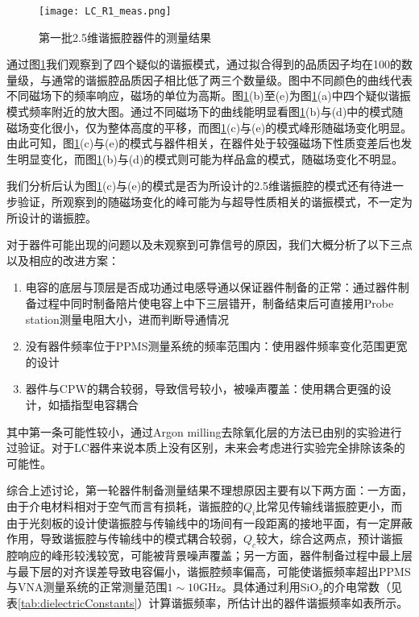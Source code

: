             \begin{figure}[h]
                \centering
                \texttt{[image: LC\_R1\_meas.png]}
                \caption{第一批2.5维谐振腔器件的测量结果}
                \label{fig:LC_R1_meas}
            \end{figure}


            通过图\ref{fig:LC_R1_meas}我们观察到了四个疑似的谐振模式，通过拟合得到的品质因子均在100的数量级，与通常的谐振腔品质因子相比低了两三个数量级。图中不同颜色的曲线代表不同磁场下的频率响应，磁场的单位为高斯。图\ref{fig:LC_R1_meas}(b)至(e)为图\ref{fig:LC_R1_meas}(a)中四个疑似谐振模式频率附近的放大图。通过不同磁场下的曲线能明显看图\ref{fig:LC_R1_meas}(b)与(d)中的模式随磁场变化很小，仅为整体高度的平移，而图\ref{fig:LC_R1_meas}(c)与(e)的模式峰形随磁场变化明显。由此可知，图\ref{fig:LC_R1_meas}(c)与(e)的模式与器件相关，在器件处于较强磁场下性质变差后也发生明显变化，而图\ref{fig:LC_R1_meas}(b)与(d)的模式则可能为样品盒的模式，随磁场变化不明显。


            我们分析后认为图\ref{fig:LC_R1_meas}(c)与(e)的模式是否为所设计的2.5维谐振腔的模式还有待进一步验证，所观察到的随磁场变化的峰可能为与超导性质相关的谐振模式，不一定为所设计的谐振腔。

            对于器件可能出现的问题以及未观察到可靠信号的原因，我们大概分析了以下三点以及相应的改进方案：
            \begin{enumerate}
                \item 电容的底层与顶层是否成功通过电感导通以保证器件制备的正常：通过器件制备过程中同时制备陪片使电容上中下三层错开，制备结束后可直接用Probe station测量电阻大小，进而判断导通情况
                \item 没有器件频率位于PPMS测量系统的频率范围内：使用器件频率变化范围更宽的设计
                \item 器件与CPW的耦合较弱，导致信号较小，被噪声覆盖：使用耦合更强的设计，如插指型电容耦合\cite{goppl2008coplanar}
            \end{enumerate}
            其中第一条可能性较小，通过Argon milling去除氧化层的方法已由别的实验进行过验证。对于LC器件来说本质上没有区别，未来会考虑进行实验完全排除该条的可能性。

            综合上述讨论，第一轮器件制备测量结果不理想原因主要有以下两方面：一方面，由于介电材料相对于空气而言有损耗，谐振腔的$Q_i$比常见传输线谐振腔更小，而由于光刻板的设计使谐振腔与传输线中的场间有一段距离的接地平面，有一定屏蔽作用，导致谐振腔与传输线中的模式耦合较弱，$Q_c$较大，综合这两点，预计谐振腔响应的峰形较浅较宽，可能被背景噪声覆盖；另一方面，器件制备过程中最上层与最下层的对齐误差导致电容偏小，谐振腔频率偏高，可能使谐振频率超出PPMS与VNA测量系统的正常测量范围$1\sim 10$GHz。具体通过利用SiO$_2$的介电常数（见表\ref{tab:dielectricConstants}）计算谐振频率，所估计出的器件谐振频率如表所示。


